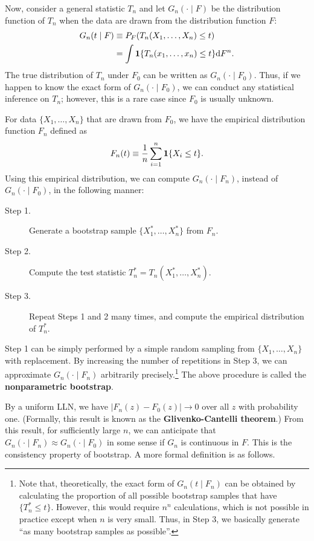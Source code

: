 \documentclass[11pt, A4paper, openany, uplatex]{book}
\begin{document}
Now, consider a general statistic $T_n$ and let $G_n(\cdot \mid F)$ be the distribution function of $T_n$ when the data are drawn from the distribution function $F$:
\begin{align*}
	G_n(t \mid F) 
	& \equiv P_F(T_n(X_1, \ldots, X_n) \le t) \\
	& = \int \mathbf{1}\{T_n(x_1, \ldots, x_n) \le t\} \mathrm{d} F^n.
\end{align*}
The true distribution of $T_n$ under $F_0$ can be written as $G_n(\cdot \mid F_0)$.
Thus, if we happen to know the exact form of $G_n(\cdot \mid F_0)$, we can conduct any statistical inference on $T_n$; however, this is a rare case since $F_0$ is usually unknown.

For data $\{X_1, \ldots, X_n\}$ that are drawn from $F_0$, we have the empirical distribution function $F_n$ defined as
\begin{align*}
	F_n(t) \equiv \frac{1}{n}\sum_{i = 1}^n \mathbf{1}\{X_i \le t\}.
\end{align*} 
Using this empirical distribution, we can compute $G_n(\cdot \mid F_n)$, instead of $G_n(\cdot \mid F_0)$, in the following manner:
\begin{description}
	\item[Step 1.] Generate a bootstrap sample $\{X_1^*, \dots, X_n^*\}$ from $F_n$. 
	\item[Step 2.] Compute the test statistic $T_n^* = T_n(X_1^*, \dots, X_n^*)$.
	\item[Step 3.] Repeat Steps 1 and 2 many times, and compute the empirical distribution of $T_n^*$. 
\end{description}
Step 1 can be simply performed by a simple random sampling from $\{X_1, \ldots, X_n\}$ with replacement.
By increasing the number of repetitions in Step 3, we can approximate $G_n(\cdot \mid F_n)$ arbitrarily precisely.\footnote{
	Note that, theoretically, the exact form of $G_n(t \mid F_n)$ can be obtained by calculating the proportion of all possible bootstrap samples that have $\{T_n^* \le t\}$.
	However, this would require $n^n$ calculations, which is not possible in practice except when $n$ is very small.
	Thus, in Step 3, we basically generate ``as many bootstrap samples as possible''.
}
The above procedure is called the \textbf{nonparametric bootstrap}.

By a uniform LLN, we have $|F_n(z) - F_0(z)| \to 0$ over all $z$ with probability one.
(Formally, this result is known as the \textbf{Glivenko-Cantelli theorem}.)
From this result,  for sufficiently large $n$, we can anticipate that $G_n(\cdot \mid F_n) \approx G_n(\cdot \mid F_0)$ in some sense if $G_n$ is continuous in $F$.
This is the consistency property of bootstrap.
A more formal definition is as follows.
\end{document}
